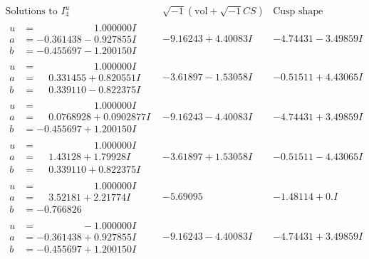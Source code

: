 \documentclass[1p]{elsarticle_modified}
\theoremstyle{definition}
\newcommand{\I}{\sqrt{-1}}
\begin{document}
$$\begin{array}{c|c|c}  
\text{Solutions to }I^u_{4}& \I (\text{vol} + \sqrt{-1}CS) & \text{Cusp shape}\\
 \hline 
\begin{aligned}
u &= \phantom{-0.000000 -}1.000000 I \\
a &= -0.361438 - 0.927855 I \\
b &= -0.455697 - 1.200150 I\end{aligned}
 & -9.16243 + 4.40083 I & -4.74431 - 3.49859 I \\ \hline\begin{aligned}
u &= \phantom{-0.000000 -}1.000000 I \\
a &= \phantom{-}0.331455 + 0.820551 I \\
b &= \phantom{-}0.339110 - 0.822375 I\end{aligned}
 & -3.61897 - 1.53058 I & -0.51511 + 4.43065 I \\ \hline\begin{aligned}
u &= \phantom{-0.000000 -}1.000000 I \\
a &= \phantom{-}0.0768928 + 0.0902877 I \\
b &= -0.455697 + 1.200150 I\end{aligned}
 & -9.16243 - 4.40083 I & -4.74431 + 3.49859 I \\ \hline\begin{aligned}
u &= \phantom{-0.000000 -}1.000000 I \\
a &= \phantom{-}1.43128 + 1.79928 I \\
b &= \phantom{-}0.339110 + 0.822375 I\end{aligned}
 & -3.61897 + 1.53058 I & -0.51511 - 4.43065 I \\ \hline\begin{aligned}
u &= \phantom{-0.000000 -}1.000000 I \\
a &= \phantom{-}3.52181 + 2.21774 I \\
b &= -0.766826\phantom{ +0.000000I}\end{aligned}
 & -5.69095\phantom{ +0.000000I} & -1.48114 + 0. I\phantom{ +0.000000I} \\ \hline\begin{aligned}
u &= \phantom{-0.000000 } -1.000000 I \\
a &= -0.361438 + 0.927855 I \\
b &= -0.455697 + 1.200150 I\end{aligned}
 & -9.16243 - 4.40083 I & -4.74431 + 3.49859 I \\ \hline\begin{aligned}

\end{aligned}
\end{array}$$
\end{document}
